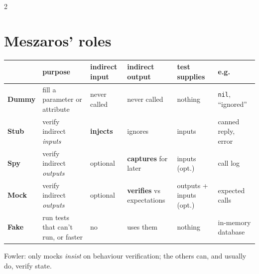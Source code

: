 \documentclass[8pt]{extarticle}
\newcommand\ct[1]{\texttt{#1}}
\begin{document}
\begin{multicols}{2}
\raggedright
\footnotesize{}

\section{Meszaros' roles}
{\scriptsize\setlength{\tabcolsep}{2pt}
\begin{tabular}{@{}>{\raggedright\arraybackslash}p{7.5mm}>{\raggedright\arraybackslash}p{15.5mm}>{\raggedright\arraybackslash}p{10mm}>{\raggedright\arraybackslash}p{15mm}>{\raggedright\arraybackslash}p{10.5mm}>{\raggedright\arraybackslash}p{12mm}@{}}
\toprule
& \textbf{purpose} & \textbf{indirect input} & \textbf{indirect output} & \textbf{test supplies} & \textbf{e.g.}\\
\midrule
\textbf{Dummy} & fill a parameter or attribute & never called & never called & nothing & \ct{nil}, ``ignored''\\
\textbf{Stub} & verify indirect \emph{inputs} & \textbf{injects} & ignores & inputs & canned reply, error\\
\textbf{Spy} & verify indirect \emph{outputs} & optional & \textbf{captures} for later & inputs (opt.) & call log\\
\textbf{Mock} & verify indirect \emph{outputs} & optional & \textbf{verifies} vs expectations & outputs + inputs (opt.) & expected calls\\
\textbf{Fake} & run tests that can't run, or faster & no & uses them & nothing & in-memory database\\
\bottomrule
\end{tabular}}\par
Fowler: only mocks \emph{insist} on behaviour verification; the others can, and usually do,
verify state.


\end{multicols}
\end{document}
